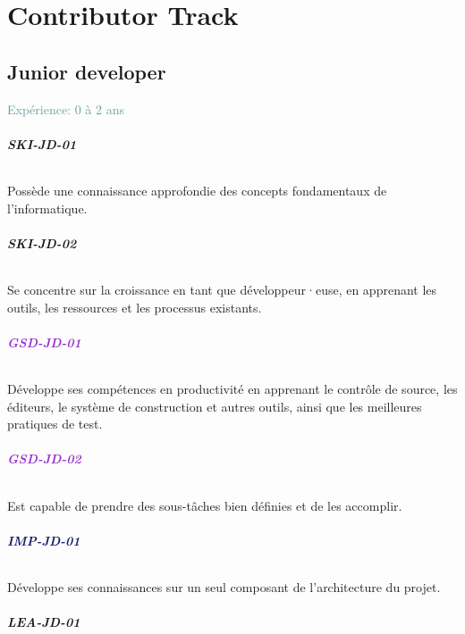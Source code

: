 \documentclass[a4paper, french, openany, 12pt]{book}
\newcommand\dex[1]{\textcolor{BrickRed}{\textbf{\uppercase{ski-{#1}}}}}
\newcommand\str[1]{\textcolor{DarkOrchid}{\textbf{\uppercase{gsd-{#1}}}}}
\newcommand\wis[1]{\textcolor{MidnightBlue}{\textbf{\uppercase{imp-{#1}}}}}
\newcommand\cha[1]{\textcolor{OliveGreen}{\textbf{\uppercase{lea-{#1}}}}}
\newcommand\xp[1]{\textcolor{CadetBlue}{Expérience: {#1} ans}}
\newcommand\dev{développeur·euse}
\begin{document}
\part{Contributor Track}

\chapter{Junior developer}

\xp{0 à 2}

\begin{multicols}{2}

  \paragraph{\dex{jd-01}} 

  Possède une connaissance approfondie des concepts fondamentaux de l'informatique.

  \paragraph{\dex{jd-02}} 

  Se concentre sur la croissance en tant que \dev, en apprenant les outils, les ressources et les processus 
  existants.

  \paragraph{\str{jd-01}}

  Développe ses compétences en productivité en apprenant le contrôle de source, les éditeurs, le système de construction 
  et autres outils, ainsi que les meilleures pratiques de test.

  \paragraph{\str{jd-02}}

  Est capable de prendre des sous-tâches bien définies et de les accomplir.

  \paragraph{\wis{jd-01}}

  Développe ses connaissances sur un seul composant de l'architecture du projet.

  \paragraph{\cha{jd-01}}


\end{multicols}
\end{document}
